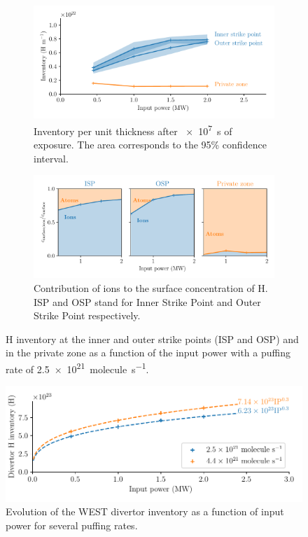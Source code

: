 \begin{figure}[h]
    \centering
    \begin{subfigure}{\linewidth}
        \includegraphics[width=\linewidth]{Figures/Chapter4/WEST/inventory_at_sps_and_private_zone_vs_input_power.pdf}
        \caption{Inventory per unit thickness after \SI{e7}{s} of exposure. The area corresponds to the 95\% confidence interval.}
    \end{subfigure}
    \begin{subfigure}{\linewidth}                          
        \includegraphics[width=\linewidth]{Figures/Chapter4/WEST/ions_ratio_vs_input_power.pdf}
        \caption{Contribution of ions to the surface concentration of H. ISP and OSP stand for Inner Strike Point and Outer Strike Point respectively.}
    \end{subfigure}%
    \caption{H inventory at the inner and outer strike points (ISP and OSP) and in the private zone as a function of the input power with a puffing rate of \SI{2.5e21}{molecule.s^{-1}}.}
\end{figure}

\begin{figure}
    \centering
    \includegraphics[width=\linewidth]{Figures/Chapter4/WEST/inventory_vs_input_power.pdf}
    \caption{Evolution of the WEST divertor inventory as a function of input power for several puffing rates.}
\end{figure}

